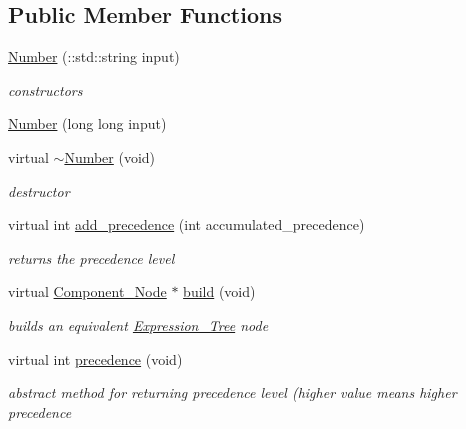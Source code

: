 \subsection*{Public Member Functions}
\begin{DoxyCompactItemize}
\item 
\hyperlink{classMadara_1_1Expression__Tree_1_1Number_ae7638945db81a83129abf459522809b0}{Number} (::std::string input)
\begin{DoxyCompactList}\small\item\em constructors \item\end{DoxyCompactList}\item 
\hyperlink{classMadara_1_1Expression__Tree_1_1Number_a8fbc2c8731923c335e07ef4f2de181ea}{Number} (long long input)
\item 
virtual \hyperlink{classMadara_1_1Expression__Tree_1_1Number_aa50bcb8c374a117d7c34ad645fe69e3d}{$\sim$Number} (void)
\begin{DoxyCompactList}\small\item\em destructor \item\end{DoxyCompactList}\item 
virtual int \hyperlink{classMadara_1_1Expression__Tree_1_1Number_a8a8d856493d784bb6886e816d541d83b}{add\_\-precedence} (int accumulated\_\-precedence)
\begin{DoxyCompactList}\small\item\em returns the precedence level \item\end{DoxyCompactList}\item 
virtual \hyperlink{classMadara_1_1Expression__Tree_1_1Component__Node}{Component\_\-Node} $\ast$ \hyperlink{classMadara_1_1Expression__Tree_1_1Number_a23102e96f767197c75bfb0e95a482c56}{build} (void)
\begin{DoxyCompactList}\small\item\em builds an equivalent \hyperlink{classMadara_1_1Expression__Tree_1_1Expression__Tree}{Expression\_\-Tree} node \item\end{DoxyCompactList}\item 
virtual int \hyperlink{classMadara_1_1Expression__Tree_1_1Symbol_ac060dedb8d16864591b259df375109b3}{precedence} (void)
\begin{DoxyCompactList}\small\item\em abstract method for returning precedence level (higher value means higher precedence \item\end{DoxyCompactList}\end{DoxyCompactItemize}
